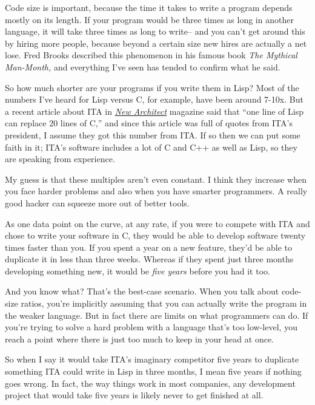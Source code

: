 \documentclass[12pt]{book}
\begin{document}
Code size is important, because the time it takes to write a program
depends mostly on its length. If your program would be three times as
long in another language, it will take three times as long to write--
and you can't get around this by hiring more people, because beyond a
certain size new hires are actually a net lose. Fred Brooks described
this phenomenon in his famous book \emph{The Mythical Man-Month,} and
everything I've seen has tended to confirm what he said.

So how much shorter are your programs if you write them in Lisp? Most of
the numbers I've heard for Lisp versus C, for example, have been around
7-10x. But a recent article about ITA in
\href{http://www.newarchitectmag.com/documents/s=2286/new1015626014044/}{\emph{New
Architect}} magazine said that ``one line of Lisp can replace 20 lines
of C,'' and since this article was full of quotes from ITA's president,
I assume they got this number from ITA. If so then we can put some faith
in it; ITA's software includes a lot of C and C++ as well as Lisp, so
they are speaking from experience.

My guess is that these multiples aren't even constant. I think they
increase when you face harder problems and also when you have smarter
programmers. A really good hacker can squeeze more out of better tools.

As one data point on the curve, at any rate, if you were to compete with
ITA and chose to write your software in C, they would be able to develop
software twenty times faster than you. If you spent a year on a new
feature, they'd be able to duplicate it in less than three weeks.
Whereas if they spent just three months developing something new, it
would be \emph{five years} before you had it too.

And you know what? That's the best-case scenario. When you talk about
code-size ratios, you're implicitly assuming that you can actually write
the program in the weaker language. But in fact there are limits on what
programmers can do. If you're trying to solve a hard problem with a
language that's too low-level, you reach a point where there is just too
much to keep in your head at once.

So when I say it would take ITA's imaginary competitor five years to
duplicate something ITA could write in Lisp in three months, I mean five
years if nothing goes wrong. In fact, the way things work in most
companies, any development project that would take five years is likely
never to get finished at all.
\end{document}
